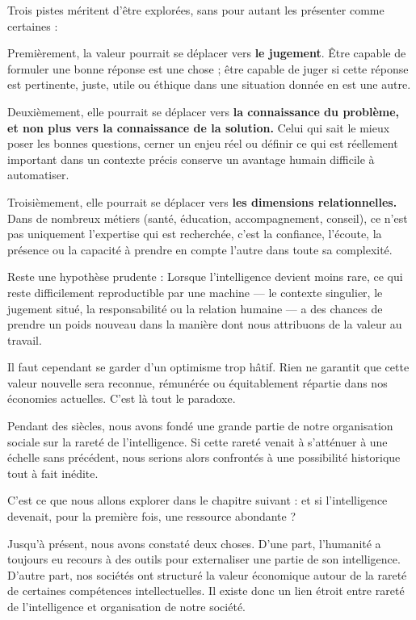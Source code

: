 Trois pistes méritent d'être explorées, sans pour autant les présenter comme certaines :

Premièrement, la valeur pourrait se déplacer vers \textbf{le jugement}. Être capable de formuler une bonne réponse est une chose ; être capable de juger si cette réponse est pertinente, juste, utile ou éthique dans une situation donnée en est une autre.

Deuxièmement, elle pourrait se déplacer vers \textbf{la connaissance du problème, et non plus vers la connaissance de la solution.} Celui qui sait le mieux poser les bonnes questions, cerner un enjeu réel ou définir ce qui est réellement important dans un contexte précis conserve un avantage humain difficile à automatiser.

Troisièmement, elle pourrait se déplacer vers \textbf{les dimensions relationnelles.} Dans de nombreux métiers (santé, éducation, accompagnement, conseil), ce n'est pas uniquement l'expertise qui est recherchée, c'est la confiance, l'écoute, la présence ou la capacité à prendre en compte l'autre dans toute sa complexité.

Reste une hypothèse prudente : Lorsque l'intelligence devient moins rare, ce qui reste difficilement reproductible par une machine — le contexte singulier, le jugement situé, la responsabilité ou la relation humaine — a des chances de prendre un poids nouveau dans la manière dont nous attribuons de la valeur au travail.

Il faut cependant se garder d'un optimisme trop hâtif. Rien ne garantit que cette valeur nouvelle sera reconnue, rémunérée ou équitablement répartie dans nos économies actuelles. C'est là tout le paradoxe.

Pendant des siècles, nous avons fondé une grande partie de notre organisation sociale sur la rareté de l'intelligence. Si cette rareté venait à s'atténuer à une échelle sans précédent, nous serions alors confrontés à une possibilité historique tout à fait inédite.

C'est ce que nous allons explorer dans le chapitre suivant : et si l'intelligence devenait, pour la première fois, une ressource abondante ?


Jusqu'à présent, nous avons constaté deux choses. D'une part, l'humanité a toujours eu recours à des outils pour externaliser une partie de son intelligence. D'autre part, nos sociétés ont structuré la valeur économique autour de la rareté de certaines compétences intellectuelles. Il existe donc un lien étroit entre rareté de l'intelligence et organisation de notre société.

